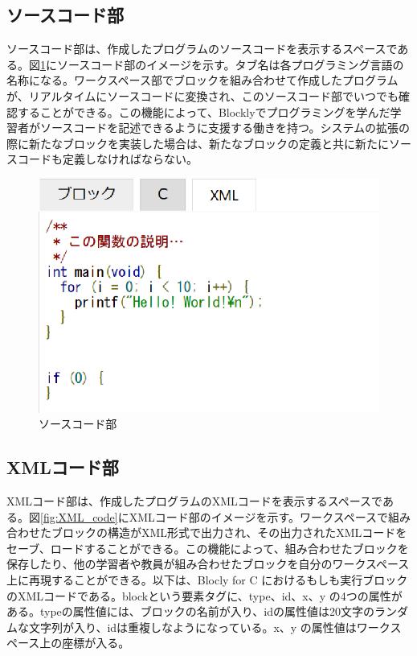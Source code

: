 \documentclass{eniepaper}
\begin{document}
   \subsection{ソースコード部}
   
ソースコード部は、作成したプログラムのソースコードを表示するスペースである。図\ref{fig:source_code}にソースコード部のイメージを示す。タブ名は各プログラミング言語の名称になる。ワークスペース部でブロックを組み合わせて作成したプログラムが、リアルタイムにソースコードに変換され、このソースコード部でいつでも確認することができる。この機能によって、Blocklyでプログラミングを学んだ学習者がソースコードを記述できるように支援する働きを持つ。システムの拡張の際に新たなブロックを実装した場合は、新たなブロックの定義と共に新たにソースコードも定義しなければならない。

\begin{figure}[h]
\begin{center}
\includegraphics[scale=0.5]{img/source_code.eps}
\caption{ソースコード部}%
\label{fig:source_code}
\end{center}%
\end{figure}%

   \subsection{XMLコード部}
   
XMLコード部は、作成したプログラムのXMLコードを表示するスペースである。図\ref{fig:XML_code}にXMLコード部のイメージを示す。ワークスペースで組み合わせたブロックの構造がXML形式で出力され、その出力されたXMLコードをセーブ、ロードすることができる。この機能によって、組み合わせたブロックを保存したり、他の学習者や教員が組み合わせたブロックを自分のワークスペース上に再現することができる。以下は、Blocly for C におけるもしも実行ブロックのXMLコードである。blockという要素タグに、type、id、x、y の4つの属性がある。typeの属性値には、ブロックの名前が入り、idの属性値は20文字のランダムな文字列が入り、idは重複しなようになっている。x、y の属性値はワークスペース上の座標が入る。
\end{document}
